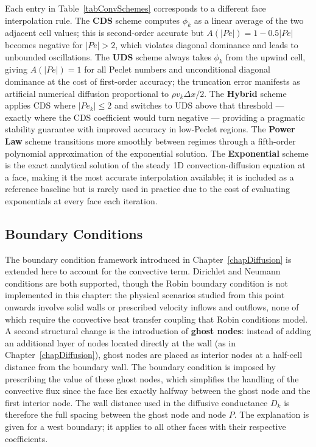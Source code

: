 Each entry in Table~\ref{tabConvSchemes} corresponds to a different face interpolation rule. The \textbf{CDS} scheme computes $\phi_k$ as a linear average of the two adjacent cell values; this is second-order accurate but $A(|Pe|) = 1 - 0.5|Pe|$ becomes negative for $|Pe| > 2$, which violates diagonal dominance and leads to unbounded oscillations. The \textbf{UDS} scheme always takes $\phi_k$ from the upwind cell, giving $A(|Pe|) = 1$ for all Peclet numbers and unconditional diagonal dominance at the cost of first-order accuracy; the truncation error manifests as artificial numerical diffusion proportional to $\rho v_k \Delta x / 2$. The \textbf{Hybrid} scheme applies CDS where $|Pe_k| \leq 2$ and switches to UDS above that threshold — exactly where the CDS coefficient would turn negative — providing a pragmatic stability guarantee with improved accuracy in low-Peclet regions. The \textbf{Power Law} scheme transitions more smoothly between regimes through a fifth-order polynomial approximation of the exponential solution. The \textbf{Exponential} scheme is the exact analytical solution of the steady 1D convection-diffusion equation at a face, making it the most accurate interpolation available; it is included as a reference baseline but is rarely used in practice due to the cost of evaluating exponentials at every face each iteration.

\subsection{Boundary Conditions}
The boundary condition framework introduced in Chapter~\ref{chapDiffusion} is extended here to account for the convective term. Dirichlet and Neumann conditions are both supported, though the Robin boundary condition is not implemented in this chapter: the physical scenarios studied from this point onwards involve solid walls or prescribed velocity inflows and outflows, none of which require the convective heat transfer coupling that Robin conditions model. A second structural change is the introduction of \textbf{ghost nodes}: instead of adding an additional layer of nodes located directly at the wall (as in Chapter~\ref{chapDiffusion}), ghost nodes are placed as interior nodes at a half-cell distance from the boundary wall. The boundary condition is imposed by prescribing the value of these ghost nodes, which simplifies the handling of the convective flux since the face lies exactly halfway between the ghost node and the first interior node. The wall distance used in the diffusive conductance $D_k$ is therefore the full spacing between the ghost node and node $P$. The explanation is given for a west boundary; it applies to all other faces with their respective coefficients.

